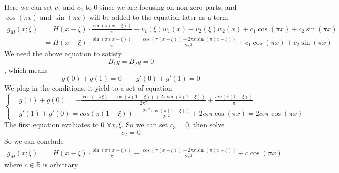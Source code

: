 \documentclass{article}
\begin{document}
Here we can set $c_1$ and $c_2$ to 0 since we are focusing on non-zero parts, and $\cos(\pi x)$ and $\sin(\pi x)$ will be added to the equation later as a term.
\begin{align*}
	g_M(x;\xi) &= H(x-\xi)\cdot \frac{\sin \left( \pi (x- \xi) \right)}{\pi} - v_1(\xi)w_1(x) - v_2(\xi)w_2(x) +c_1 \cos(\pi x)+c_2 \sin(\pi x) \\
	&= H(x-\xi)\cdot \frac{\sin \left( \pi (x- \xi) \right)}{\pi}- \frac{\cos(\pi(x-\xi))+2 \pi x \sin(\pi (x-\xi))}{2 \pi^2} +c_1 \cos(\pi x)+ c_2\sin(\pi x)
\end{align*}
We need the above equation to satisfy 
\[
	B_1g=B_2g= 0
\]
, which means 
\[
	g(0)+g(1) = 0 \qquad g'(0)+g'(1) = 0
\] 
We plug in the conditions, it yield to a set of equation
\[
\left\{
\begin{aligned}
	&g(1)+g(0) = -\frac{\cos(-\pi \xi)+\cos(\pi(1-\xi))+2\pi \sin(\pi(1-\xi))}{2\pi^2}+ \frac{sin(\pi(1-\xi))}{\pi} \\
	&g'(1)+g'(0)=cos(\pi(1-\xi)) - \frac{2 \pi^2 \cos(\pi(1- \xi))}{2 \pi^2}+2c_2 \pi \cos(\pi x) = 2 c_2 \pi \cos(\pi x)
	\end{aligned}\right.
\]	
The first equation evaluates to 0 $\forall x, \xi$. So we can set $c_3 = 0$, then solve 
\[
	c_2 = 0
\]	
So we can conclude
\begin{align*}
	g_M(x;\xi)
	&= H(x-\xi)\cdot \frac{\sin \left( \pi (x- \xi) \right)}{\pi}- \frac{\cos(\pi(x-\xi))+2 \pi x \sin(\pi (x-\xi))}{2 \pi^2} +c \cos(\pi x)
\end{align*}
where $c \in \mathbb{R}$ is arbitrary
\end{document}
